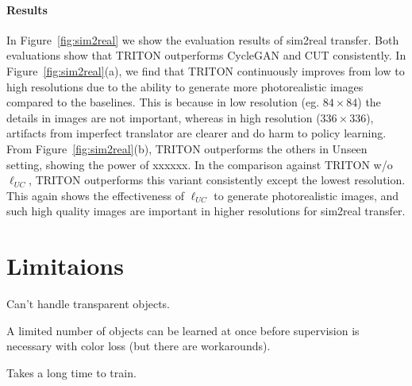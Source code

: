 \documentclass{article}
\begin{document}
\paragraph{Results}
In Figure~\ref{fig:sim2real} we show the evaluation results of sim2real transfer. Both evaluations show that TRITON outperforms CycleGAN and CUT consistently. In Figure~\ref{fig:sim2real}(a), we find that TRITON continuously improves from low to high resolutions due to the ability to generate more photorealistic images compared to the baselines. This is because in low resolution (eg. $84\times 84$) the details in images are not important, whereas in high resolution ($336\times 336$), artifacts from imperfect translator are clearer and do harm to policy learning.
From Figure~\ref{fig:sim2real}(b), TRITON outperforms the others in Unseen setting, showing the power of xxxxxx.
In the comparison against TRITON w/o $\ell_{UC}$, TRITON outperforms this variant consistently except the lowest resolution. This again shows the effectiveness of $\ell_{UC}$ to generate photorealistic images, and such high quality images are important in higher resolutions for sim2real transfer.







\section{Limitaions}
\label{sec:Limitations} 

Can't handle transparent objects. 

A limited number of objects can be learned at once before supervision is necessary with color loss (but there are workarounds).

Takes a long time to train.




\end{document}
